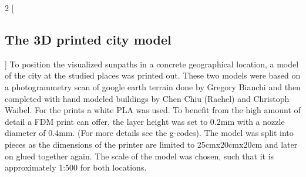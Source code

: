 \documentclass[a4paper,9pt]{article}
\begin{document}
\begin{multicols}{2}
    [
    \subsection{The 3D printed city model}
    ]
    To position the visualized sunpaths in a concrete geographical location, a model of the city at the studied places was printed out. These two models were based on a photogrammetry scan of google earth terrain done by Gregory Bianchi and then completed with hand modeled buildings by Chen Chiu (Rachel) and Christoph Waibel. For the prints a white PLA was used. To benefit from the high amount of detail a FDM print can offer, the layer height was set to 0.2mm with a nozzle diameter of 0.4mm. (For more details see the g-codes). The model was split into pieces as the dimensions of the printer are limited to 25cmx20cmx20cm and later on glued together again. The scale of the model was chosen, such that it is approximately 1:500 for both locations.
\end{multicols}
\end{document}
